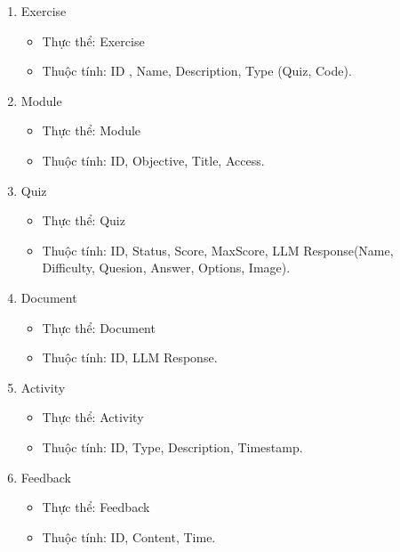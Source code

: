 \begin{enumerate}
\begin{itemize}
    \end{itemize}
    \item Exercise
    \begin{itemize}
        \item Thực thể: Exercise
        \item Thuộc tính: ID , Name, Description, Type (Quiz, Code).
    \end{itemize}
    \item Module
    \begin{itemize}
        \item Thực thể: Module
        \item Thuộc tính: ID, Objective, Title, Access.
    \end{itemize}
    \item Quiz
    \begin{itemize}
        \item Thực thể: Quiz
        \item Thuộc tính: ID, Status, Score, MaxScore, LLM Response(Name, Difficulty, Quesion, Answer, Options, Image).
    \end{itemize}
    \item Document
     \begin{itemize}
        \item Thực thể: Document
        \item Thuộc tính: ID, LLM Response.
    \end{itemize}
    \item Activity
     \begin{itemize}
        \item Thực thể: Activity    
        \item Thuộc tính: ID, Type, Description, Timestamp.
    \end{itemize}
    \item Feedback
     \begin{itemize}
        \item Thực thể: Feedback    
        \item Thuộc tính: ID, Content, Time.
    \end{itemize}
\end{enumerate}
